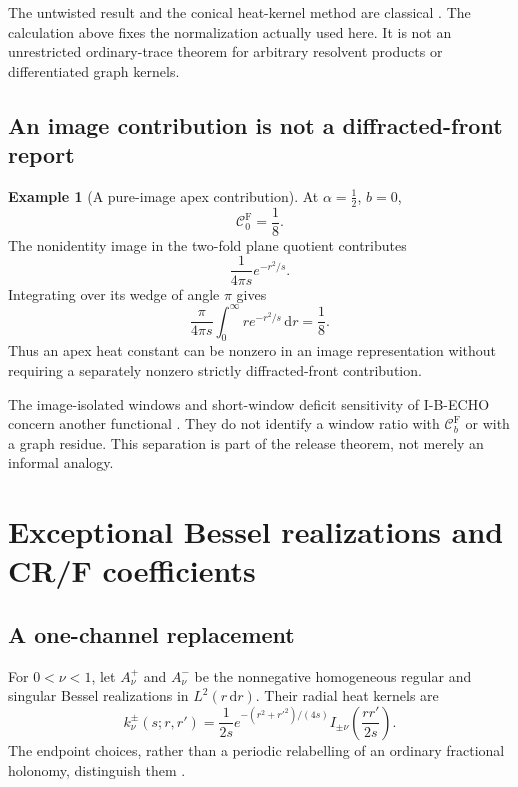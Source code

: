 \documentclass[11pt,a4paper]{article}
\newcommand{\dd}{\mathrm d}
\newcommand{\Fr}{\mathrm F}
\newcommand{\Ccal}{\mathcal C}
\theoremstyle{plain}
\theoremstyle{definition}
\newtheorem{example}[theorem]{Example}
\theoremstyle{remark}
\numberwithin{equation}{section}
\begin{document}
The untwisted result and the conical heat-kernel method are
classical \cite{Fursaev1994,FursaevMiele,Vassilevich}.
The calculation above fixes the normalization actually used here.
It is not an unrestricted ordinary-trace theorem for arbitrary
resolvent products or differentiated graph kernels.

\subsection{An image contribution is not a diffracted-front report}

\begin{example}[A pure-image apex contribution]
\label{ex:image}
At \(\alpha=\tfrac12\), \(b=0\),
\[
 \Ccal_0^\Fr=\frac18.
\]
The nonidentity image in the two-fold plane quotient contributes
\[
 \frac1{4\pi s}e^{-r^2/s}.
\]
Integrating over its wedge of angle \(\pi\) gives
\[
 \frac{\pi}{4\pi s}
 \int_0^\infty r e^{-r^2/s}\,\dd r=\frac18.
\]
Thus an apex heat constant can be nonzero in an image
representation without requiring a separately nonzero strictly
diffracted-front contribution.
\end{example}

The image-isolated windows and short-window deficit sensitivity
of I-B-ECHO concern another functional
\cite{CheungEcho}. They do not identify a window ratio with
\(\Ccal_b^\Fr\) or with a graph residue. This separation is part
of the release theorem, not merely an informal analogy.

\section{Exceptional Bessel realizations and CR/F coefficients}
\label{sec:branches}

\subsection{A one-channel replacement}

For \(0<\nu<1\), let \(A_\nu^+\) and \(A_\nu^-\) be the
nonnegative homogeneous regular and singular Bessel realizations
in \(L^2(r\,\dd r)\). Their radial heat kernels are
\[
 k_\nu^\pm(s;r,r')
 =\frac1{2s}e^{-(r^2+r'^2)/(4s)}
          I_{\pm\nu}\!\left(\frac{rr'}{2s}\right).
\]
The endpoint choices, rather than a periodic relabelling of an
ordinary fractional holonomy, distinguish them
\cite{DerezinskiRichard}.
\end{document}
